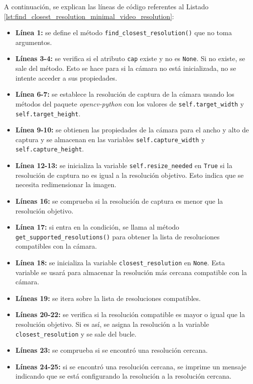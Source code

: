 A continuación, se explican las líneas de código referentes al Listado \ref{lst:find_closest_resolution_minimal_video_resolution}:
\begin{itemize}
    \item \textbf{Línea 1:} se define el método \texttt{find\_closest\_resolution()} que no toma argumentos.
    \item \textbf{Líneas 3-4:} se verifica si el atributo \texttt{cap} existe y no es \texttt{None}. Si no existe, se sale del método. Esto se hace para si la cámara no está inicializada, no se intente acceder a sus propiedades.
    \item \textbf{Línea 6-7:} se establece la resolución de captura de la cámara usando los métodos del paquete \textit{opencv-python} con los valores de \texttt{self.target\_width} y \texttt{self.target\_height}.
    \item \textbf{Línea 9-10:} se obtienen las propiedades de la cámara para el ancho y alto de captura y se almacenan en las variables \texttt{self.capture\_width} y \texttt{self.capture\_height}.
    \item \textbf{Línea 12-13:} se inicializa la variable \texttt{self.resize\_needed} en \texttt{True} si la resolución de captura no es igual a la resolución objetivo. Esto indica que se necesita redimensionar la imagen.
    \item \textbf{Líneas 16:} se comprueba si la resolución de captura es menor que la resolución objetivo. 
    \item \textbf{Línea 17:} si entra en la condición, se llama al método \texttt{get\_supported\_resolutions()} para obtener la lista de resoluciones compatibles con la cámara.
    \item \textbf{Línea 18:} se inicializa la variable \texttt{closest\_resolution} en \texttt{None}. Esta variable se usará para almacenar la resolución más cercana compatible con la cámara.
    \item \textbf{Líneas 19:} se itera sobre la lista de resoluciones compatibles.
    \item \textbf{Líneas 20-22:} se verifica si la resolución compatible es mayor o igual que la resolución objetivo. Si es así, se asigna la resolución a la variable \texttt{closest\_resolution} y se sale del bucle.
    \item \textbf{Líneas 23:} se comprueba si se encontró una resolución cercana.
    \item \textbf{Líneas 24-25:} si se encontró una resolución cercana, se imprime un mensaje indicando que se está configurando la resolución a la resolución cercana. 

\end{itemize}
